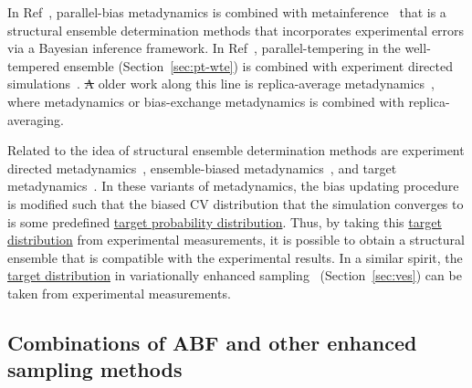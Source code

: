 \documentclass[9pt,review]{livecoms}
\providecommand{\DIFaddtex}[1]{{\protect\color{blue}\uwave{#1}}} %
\providecommand{\DIFdeltex}[1]{{\protect\color{red}\sout{#1}}}                      %
\providecommand{\DIFaddbegin}{} %
\providecommand{\DIFaddend}{} %
\providecommand{\DIFdelbegin}{} %
\providecommand{\DIFdelend}{} %
\providecommand{\DIFadd}[1]{\texorpdfstring{\DIFaddtex{#1}}{#1}} %
\providecommand{\DIFdel}[1]{\texorpdfstring{\DIFdeltex{#1}}{}} %
\newcommand{\DIFscaledelfig}{0.5}
\newlength{\DIFdelgraphicswidth} %
\newlength{\DIFdelgraphicsheight} %
\newcommand{\DIFaddincludegraphics}[2][]{{\color{blue}\fbox{\DIFOincludegraphics[#1]{#2}}}} %
\newcommand{\DIFdelincludegraphics}[2][]{%
\sbox{\DIFdelgraphicsbox}{\DIFOincludegraphics[#1]{#2}}%
\settoboxwidth{\DIFdelgraphicswidth}{\DIFdelgraphicsbox} %
\settoboxtotalheight{\DIFdelgraphicsheight}{\DIFdelgraphicsbox} %
\scalebox{\DIFscaledelfig}{%
\parbox[b]{\DIFdelgraphicswidth}{\usebox{\DIFdelgraphicsbox}\\[-\baselineskip] \rule{\DIFdelgraphicswidth}{0em}}\llap{\resizebox{\DIFdelgraphicswidth}{\DIFdelgraphicsheight}{%
\setlength{\unitlength}{\DIFdelgraphicswidth}%
\begin{picture}(1,1)%
\thicklines\linethickness{2pt} %
{\color[rgb]{1,0,0}\put(0,0){\framebox(1,1){}}}%
{\color[rgb]{1,0,0}\put(0,0){\line( 1,1){1}}}%
{\color[rgb]{1,0,0}\put(0,1){\line(1,-1){1}}}%
\end{picture}%
}\hspace*{3pt}}} %
} %
\DeclareRobustCommand{\DIFaddbegin}{\DIFOaddbegin \let\includegraphics\DIFaddincludegraphics} %
\DeclareRobustCommand{\DIFaddend}{\DIFOaddend \let\includegraphics\DIFOincludegraphics} %
\DeclareRobustCommand{\DIFdelbegin}{\DIFOdelbegin \let\includegraphics\DIFdelincludegraphics} %
\DeclareRobustCommand{\DIFdelend}{\DIFOaddend \let\includegraphics\DIFOincludegraphics} %
\begin{document}
In Ref~\cite{Bonomi_MetadynamicMetainference_SciRep2016}, parallel-bias metadynamics is combined with metainference~\cite{Bonomi_Metainference_SciAdv2016} that is a structural ensemble determination methods that incorporates experimental errors via a Bayesian inference framework. In Ref~\cite{Amirkulova_PTWTE-EDS_JPCB2020}, parallel-tempering in the well-tempered ensemble (Section~\ref{sec:pt-wte}) is combined with experiment directed simulations~\cite{White_EDS_JCTC2014}.
\DIFdelbegin \DIFdel{A }\DIFdelend \DIFaddbegin \DIFadd{An }\DIFaddend older work along this line is replica-average metadynamics~\cite{Camilloni_RAM_2013,Camilloni_RAM-2_JACS20214}, where metadynamics or bias-exchange metadynamics is combined with replica-averaging.

Related to the idea of structural ensemble determination methods are experiment directed metadynamics~\cite{White_EDM_2015}, ensemble-biased metadynamics~\cite{Marinelli_EnsembleBiased_2015}, and target metadynamics~\cite{GilLey_TargetMetaD_2016}. In these variants of metadynamics, the bias updating procedure is modified such that the biased CV distribution that the simulation converges to is some predefined \hyperlink{ref:targetdist}{target probability distribution}. Thus, by taking this \hyperlink{ref:targetdist}{target distribution} from experimental measurements, it is possible to obtain a structural ensemble that is compatible with the experimental results. In a similar spirit, the \hyperlink{ref:targetdist}{target distribution} in variationally enhanced sampling~\cite{Valsson_VES_PRL_2014,Valsson2020Handbook_VES} (Section~\ref{sec:ves}) can be taken from experimental measurements.

\subsection{Combinations of ABF and other enhanced sampling methods}
\label{sec:abf_hybrids}
\end{document}
